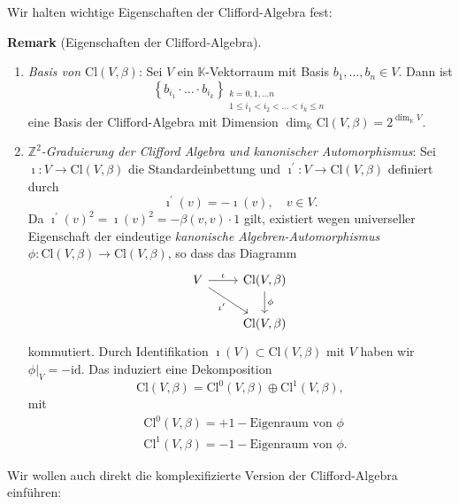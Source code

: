 \documentclass[10pt, letterpaper]{article}
\newcommand{\K}{\mathbb{K}}
\newcommand{\Z}{\mathbb{Z}}
\newcommand{\Cl}{\mathrm{Cl}}
\newcommand{\CustomHeading}[3]{%
  \par\medskip\noindent%
  \textbf{#1 #2} \textnormal{(#3)}.\enskip%
}
\newenvironment{REM}[2]{\CustomHeading{Remark}{#1}{#2}}{}
\begin{document}
Wir halten wichtige Eigenschaften der Clifford-Algebra fest:

\begin{REM}{}{Eigenschaften der Clifford-Algebra}
\begin{enumerate}
  \item \emph{Basis von $\Cl(V,\beta)$}: Sei $V$ ein $\K$-Vektorraum mit Basis $b_1, \ldots, b_n \in V$. Dann ist 
    $$
    \left\{b_{i_1} \cdot \ldots \cdot b_{i_k}\right\}_{\substack{k=0,1, \ldots n \\ 1 \leq i_1<i_2<\ldots<i_k \leq n}}
    $$
    eine Basis der Clifford-Algebra mit Dimension $\operatorname{dim}_{\mathbb{K}} \mathrm{Cl}(V, \beta)=2^{\operatorname{dim}_{\mathbb{K}} V}$.
  \item \emph{$\Z^2$-Graduierung der Clifford Algebra und kanonischer Automorphismus}: Sei $\imath: V \rightarrow \mathrm{Cl}(V, \beta)$ die Standardeinbettung und $\imath^{\prime}: V \rightarrow \mathrm{Cl}(V, \beta)$ definiert durch
    $$
    \imath^{\prime}(v)=-\imath(v), \quad  v \in V .
    $$
    Da $\imath^{\prime}(v)^2=\imath(v)^2=-\beta(v, v) \cdot 1$ gilt, existiert wegen universeller Eigenschaft der eindeutige \emph{kanonische Algebren-Automorphismus} $\phi: \mathrm{Cl}(V, \beta) \rightarrow \mathrm{Cl}(V, \beta)$, so dass das Diagramm
    \[
    \begin{tikzcd}
    V \arrow[r, "\iota"] \arrow[dr, "\iota'"'] & \Cl(V,\beta) \arrow[d, "\phi"] \\
    & \Cl(V,\beta)
    \end{tikzcd}
    \]
    kommutiert. Durch Identifikation $\imath(V) \subset \mathrm{Cl}(V, \beta)$ mit $V$ haben wir $\left.\phi\right|_V=-\mathrm{id}$. Das induziert eine Dekomposition 
    $$
    \mathrm{Cl}(V, \beta)=\mathrm{Cl}^0(V, \beta) \oplus \mathrm{Cl}^1(V, \beta),
    $$
    mit
    $$
    \begin{aligned}
    & \mathrm{Cl}^0(V, \beta)=+1-\text {Eigenraum von } \phi \\
    & \mathrm{Cl}^1(V, \beta)=-1-\text {Eigenraum von } \phi.
    \end{aligned}
    $$
\end{enumerate}
\end{REM}

\bigskip

Wir wollen auch direkt die komplexifizierte Version der Clifford-Algebra einführen:
\end{document}
